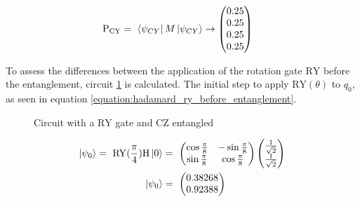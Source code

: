 \begin{equation}
    \centering
    \begin{split}
         \mathrm{P_{CY}} &=\ \bra{\psi_{CY}}M\ket{\psi_{CY}} \rightarrow \begin{pmatrix}
         0.25\\
         0.25\\
         0.25\\
         0.25\\
     \end{pmatrix}
    \end{split}
    \label{equation:cy_entanglement_with_ry}
\end{equation}

To assess the differences between the application of the rotation gate $\mathrm{RY}$ before the entanglement, circuit \ref{fig:circuit_ry_gate_cz_entangled} is calculated. The initial step to apply $\mathrm{RY}(\theta)$ to $q_0$, as seen in equation \ref{equation:hadamard_ry_before_entanglement}.

\begin{figure}[!ht]
    \centering
    \caption{Circuit with a $\mathrm{RY}$ gate and $\mathrm{CZ}$ entangled}
    \label{fig:circuit_ry_gate_cz_entangled}
\end{figure}

\begin{equation}
        \centering
    \begin{split}
          \ket{\psi_0} =\ \mathrm{RY}(\frac{\pi}{4})\mathrm{H}\ket{0} &=\ \begin{pmatrix}
        \cos{\frac{\pi}{8}} & -\sin{\frac{\pi}{8}} \\
        \sin{\frac{\pi}{8}} & \cos{\frac{\pi}{8}}
    \end{pmatrix}\begin{pmatrix}\frac{1}{\sqrt{2}}\\\frac{1}{\sqrt{2}}\end{pmatrix} \\
    \ket{\psi_0} &=\ \begin{pmatrix}
     0.38268\\
     0.92388\\
     \end{pmatrix}
    \end{split}
    \label{equation:hadamard_ry_before_entanglement}
\end{equation}

